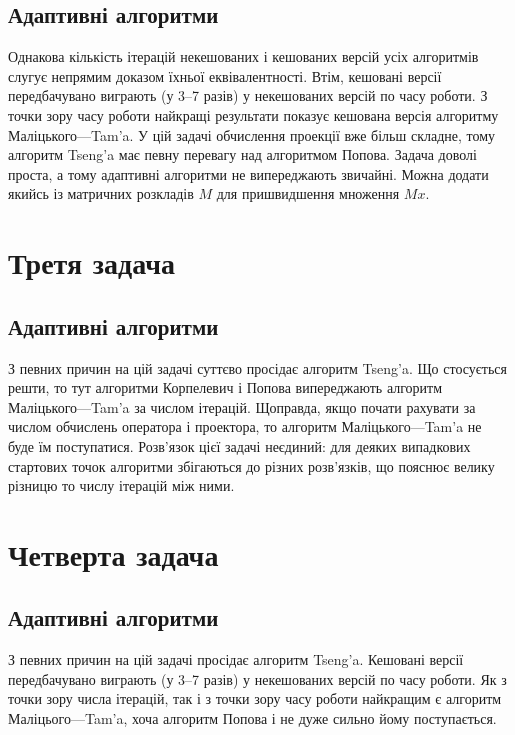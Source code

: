 \newpage\subsection{Адаптивні алгоритми}



Однакова кількість ітерацій некешованих і кешованих версій усіх алгоритмів слугує непрямим доказом їхньої еквівалентності. Втім, кешовані версії передбачувано виграють (у 3--7 разів) у некешованих версій по часу роботи. З точки зору часу роботи найкращі результати показує кешована версія алгоритму Маліцького---Tam'a. У цій задачі обчислення проекції вже більш складне, %
тому алгоритм Tseng'a має певну перевагу над алгоритмом Попова. Задача доволі проста, а тому адаптивні алгоритми не випереджають звичайні. Можна додати якийсь із матричних розкладів $M$ для пришвидшення множення $M x$.

\section{Третя задача}

\subsection{Адаптивні алгоритми}



З певних причин на цій задачі суттєво просідає алгоритм Tseng'a. Що стосується решти, то тут алгоритми Корпелевич і Попова випереджають алгоритм Маліцького---Tam'a за числом ітерацій. Щоправда, якщо почати рахувати за числом обчислень оператора і проектора, то  алгоритм Маліцького---Tam'a не буде їм поступатися. Розв'язок цієї задачі неєдиний: для деяких випадкових стартових точок алгоритми збігаються до різних розв'язків, що пояснює велику різницю то числу ітерацій між ними.

\section{Четверта задача}

\subsection{Адаптивні алгоритми}



З певних причин на цій задачі просідає алгоритм Tseng'a. Кешовані версії передбачувано виграють (у 3--7 разів) у некешованих версій по часу роботи. Як з точки зору числа ітерацій, так і з точки зору часу роботи найкращим є алгоритм Маліцього---Tam'a, хоча алгоритм Попова і не дуже сильно йому поступається.


